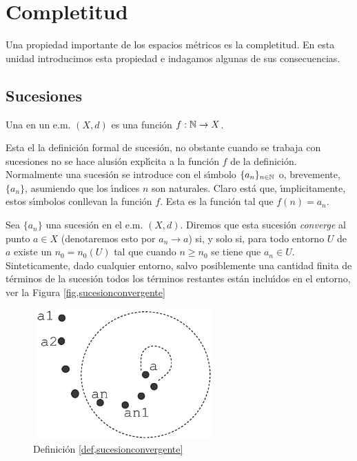\chapter{Completitud}

Una propiedad importante de los espacios m\'etricos es la
completitud. En esta unidad introducimos esta propiedad e
indagamos algunas de sus consecuencias.
\section{Sucesiones}
\begin{definicion} Una  en un e.m. $(X,d)$ es una
funci\'on $f:\nn\rightarrow X$.
\end{definicion}

Esta el la definici\'on formal de sucesi\'on, no obstante cuando
se trabaja con sucesiones no se hace alusi\'on expl\'{\i}cita a la
funci\'on $f$ de la definici\'on. Normalmente una sucesi\'on se
introduce con el s\'{\i}mbolo $\{a_n\}_{n\in\nn}$ o, brevemente,
$\{a_n\}$, asumiendo que los \'{\i}ndices $n$ son naturales. Claro
est\'a que, \'{\i}mplicitamente, estos s\'{\i}mbolos conllevan la
funci\'on $f$. Esta es la funci\'on tal que $f(n)=a_n$.

\begin{definicion}\label{def,sucesionconvergente} Sea $\{a_n\}$ una sucesi\'on en el e.m.
$(X,d)$. Diremos que esta sucesi\'on \emph{converge} al punto
$a\in X$ (denotaremos esto por $a_n\rightarrow a$) si, y solo si,
para todo entorno $U$ de $a$ existe un $n_0=n_0(U)$ tal que cuando
$n\geq n_0$ se tiene que $a_n\in U$. Sinteticamente, dado
cualquier entorno, salvo posiblemente una cantidad finita de
t\'erminos de la sucesi\'on todos los t\'erminos restantes est\'an
inclu\'{\i}dos en el entorno, ver la Figura
\vref{fig,sucesionconvergente}
\end{definicion}

\begin{figure}
\begin{center}
    \includegraphics[height=5cm, width=7cm]{succonv.eps}
    \caption{ Definici\'on
    \vref{def,sucesionconvergente}}\label{fig,sucesionconvergente}
\end{center}
\end{figure}

